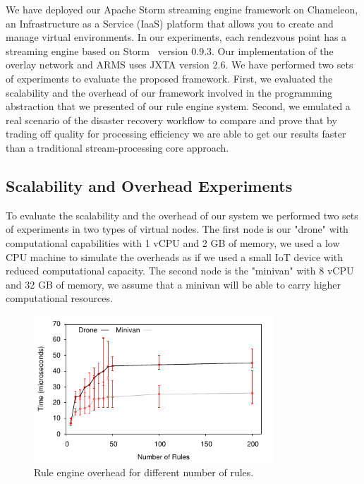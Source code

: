 We have deployed our Apache Storm streaming engine framework on Chameleon, an Infrastructure as a Service (IaaS) platform that allows you to create and manage virtual environments. In our experiments, each rendezvous point has a streaming engine based on Storm~\cite{storm} version 0.9.3. Our implementation of the overlay network and ARMS uses JXTA version 2.6. We have performed two sets of experiments to evaluate the proposed framework. First, we evaluated the scalability and the overhead of our framework involved in the programming abstraction that we presented of our rule engine system. Second, we emulated a real scenario of the disaster recovery workflow to compare and prove that by trading off quality for processing efficiency we are able to get our results faster than a traditional stream-processing core approach.

\subsection{Scalability and Overhead Experiments}

To evaluate the scalability and the overhead of our system we performed two sets of experiments in two types of virtual nodes. The first node is our "drone" with computational capabilities with 1 vCPU and 2 GB of memory, we used a low CPU machine to simulate the overheads as if we used a small IoT device with reduced computational capacity. The second node is the "minivan" with 8 vCPU and 32 GB of memory, we assume that a minivan will be able to carry higher computational resources.

\begin{figure}[h!]
  \includegraphics[width=0.8\textwidth]{Results/RuleEngine}
  \caption{Rule engine overhead for different number of rules.}
  \label{fig:RuleEngine}
  \vspace{-2ex}
\end{figure}

